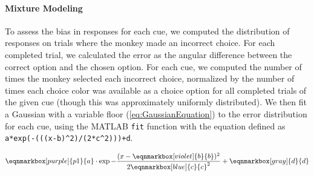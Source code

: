 
\paragraph{Mixture Modeling}\label{para:MixtureModeling}

To assess the bias in responses for each cue, we computed the distribution of responses on trials where the monkey made an incorrect choice.
For each completed trial, we calculated the error as the angular difference between the correct option and the chosen option.  
For each cue, we computed the number of times the monkey selected each incorrect choice, normalized by the number of times each choice color was available as a choice option for all completed trials of the given cue (though this was approximately uniformly distributed).
We then fit a Gaussian with a variable floor (\autoref{eq:GaussianEquation}) to the error distribution for each cue, using the MATLAB \lstinline{fit} function with the equation defined as \lstinline{a*exp(-(((x-b)^2)/(2*c^2)))+d}. 



\vspace{2em} 
\begin{equation} \label{eq:GaussianEquation}
    \eqnmarkbox[purple]{p1}{a}
    \cdot
    \exp
    -\frac{(x-
    \eqnmarkbox[violet]{b}{b}
    )^2}{2 
    \eqnmarkbox[blue]{c}{c}^2}
    +
    \eqnmarkbox[gray]{d}{d}        
\end{equation}

\vspace{2em} 

